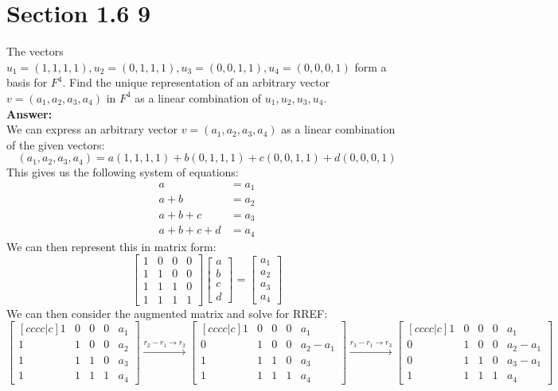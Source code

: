 \documentclass{article}
\begin{document}
\section*{Section 1.6 9}
The vectors $u_1 = (1,1,1,1), u_2 = (0,1,1,1), u_3 = (0,0,1,1), u_4 = (0,0,0,1)$ form a basis for $F^4$. Find the unique representation of an arbitrary vector $v = (a_1,a_2,a_3,a_4)$ in $F^4$ as a linear combination of $u_1 , u_2 , u_3 , u_4$.\\
\textbf{Answer:}\\
We can express an arbitrary vector $v = (a_1,a_2,a_3,a_4)$ as a linear combination of the given vectors:
$$ (a_1,a_2,a_3,a_4) = a(1,1,1,1) + b(0,1,1,1) + c(0,0,1,1) + d(0,0,0,1)$$
This gives us the following system of equations:
\begin{align*}
    a &= a_1\\
    a + b &= a_2\\
    a + b + c &= a_3\\
    a + b + c + d &= a_4
\end{align*}
We can then represent this in matrix form:
$$ \begin{bmatrix}
    1 & 0 & 0 & 0 \\
    1 & 1 & 0 & 0 \\
    1 & 1 & 1 & 0 \\
    1 & 1 & 1 & 1
\end{bmatrix} \begin{bmatrix}
    a \\ b \\ c \\ d
\end{bmatrix} = \begin{bmatrix}
    a_1 \\ a_2 \\ a_3 \\ a_4
\end{bmatrix} $$
We can then consider the augmented matrix and solve for RREF:
$$ \begin{bmatrix}[cccc|c]
    1 & 0 & 0 & 0 & a_1\\
    1 & 1 & 0 & 0 & a_2\\
    1 & 1 & 1 & 0 & a_3\\
    1 & 1 & 1 & 1 & a_4
\end{bmatrix} \xrightarrow{r_2 - r_1 \rightarrow r_2} \begin{bmatrix}[cccc|c]
    1 & 0 & 0 & 0 & a_1\\
    0 & 1 & 0 & 0 & a_2 - a_1\\
    1 & 1 & 1 & 0 & a_3\\
    1 & 1 & 1 & 1 & a_4
\end{bmatrix} \xrightarrow{r_3 - r_1 \rightarrow r_3} \begin{bmatrix}[cccc|c]
    1 & 0 & 0 & 0 & a_1\\
    0 & 1 & 0 & 0 & a_2 - a_1\\
    0 & 1 & 1 & 0 & a_3 - a_1\\
    1 & 1 & 1 & 1 & a_4
\end{bmatrix}$$
\end{document}
